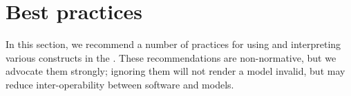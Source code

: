 
\section{Best practices}
\label{best-practices}

In this section, we recommend a number of practices for using and
interpreting various constructs in the \RenderPackage.
These recommendations are non-normative, but we advocate them strongly;
ignoring them will not render a model invalid, but may reduce
inter-operability between software and models.